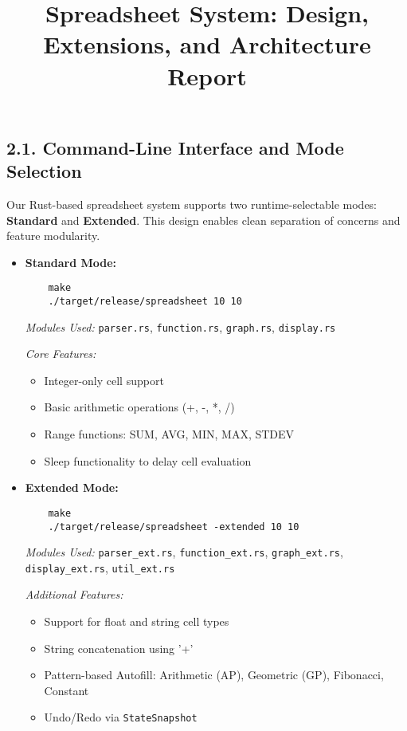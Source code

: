 
\title{Spreadsheet System: Design, Extensions, and Architecture Report}

\subsection*{2.1. Command-Line Interface and Mode Selection}
Our Rust-based spreadsheet system supports two runtime-selectable modes: \textbf{Standard} and \textbf{Extended}. This design enables clean separation of concerns and feature modularity.

\begin{itemize}[leftmargin=*]
    \item \textbf{Standard Mode:}
    \begin{verbatim}
    make 
    ./target/release/spreadsheet 10 10
    \end{verbatim}
    \textit{Modules Used:} \texttt{parser.rs}, \texttt{function.rs}, \texttt{graph.rs}, \texttt{display.rs}

    \textit{Core Features:}
    \begin{itemize}
        \item Integer-only cell support
        \item Basic arithmetic operations (+, -, *, /)
        \item Range functions: SUM, AVG, MIN, MAX, STDEV
        \item Sleep functionality to delay cell evaluation
    \end{itemize}

    \item \textbf{Extended Mode:}
    \begin{verbatim}
    make 
    ./target/release/spreadsheet -extended 10 10
    \end{verbatim}
    \textit{Modules Used:} \texttt{parser\_ext.rs}, \texttt{function\_ext.rs}, \texttt{graph\_ext.rs}, \texttt{display\_ext.rs}, \texttt{util\_ext.rs}

    \textit{Additional Features:}
    \begin{itemize}
        \item Support for float and string cell types
        \item String concatenation using '+'
        \item Pattern-based Autofill: Arithmetic (AP), Geometric (GP), Fibonacci, Constant
        \item Undo/Redo via \texttt{StateSnapshot}
    \end{itemize}
\end{itemize}

